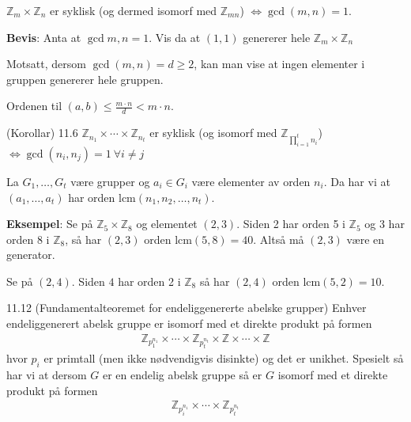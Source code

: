 \begin{theorem*}{11.5}{}
	$\mathbb{Z}_m\times \mathbb{Z}_n$ er syklisk (og dermed isomorf med $\mathbb{Z}_{mn}$)
	$\iff \gcd(m,n)=1$.
\end{theorem*}

\textbf{Bevis}: Anta at $\gcd{m,n}=1$. Vis da at $(1,1)$ genererer hele
$\mathbb{Z}_m\times \mathbb{Z}_n$

Motsatt, dersom $\gcd(m,n)=d\geq 2$, kan man vise at ingen elementer i gruppen genererer hele
gruppen.

Ordenen til $(a,b)\leq \frac{m\cdot n}{d}<m\cdot n$.

\begin{theorem*}{(Korollar) 11.6}{}
	$\mathbb{Z}_{n_1}\times\cdots\times \mathbb{Z}_{n_t}$ er syklisk (og isomorf med
	$\mathbb{Z}_{\prod_{i=1}^t n_i}$) $\iff \gcd(n_i, n_j)=1\ \forall i\neq j$
\end{theorem*}

\begin{theorem*}{11.9}{}
  La $G_1,\dots,G_t$ være grupper og $a_i\in G_i$ være elementer av orden $n_i$. Da har vi at
  $(a_1,\dots,a_t)$ har orden $\text{lcm}(n_1,n_2,\dots,n_t)$.
\end{theorem*}

\textbf{Eksempel}: Se på $\mathbb{Z}_5\times \mathbb{Z}_8$ og elementet $(2,3)$. Siden 
2 har orden 5 i $\mathbb{Z}_5$ og 3 har orden 8 i $\mathbb{Z}_8$, så har $(2,3)$
orden $\text{lcm}(5,8)=40$. Altså må $(2,3)$ være en generator.

Se på $(2,4)$. Siden $4$ har orden 2 i $\mathbb{Z}_8$ så har $(2,4)$ orden $\text{lcm}(5,2)=10$.


\begin{theorem*}{11.12 (Fundamentalteoremet for endeliggenererte abelske grupper)}{}
  Enhver endeliggenerert abelsk gruppe er isomorf med et direkte produkt på formen
  \begin{align}
    \mathbb{Z}_{p_1^{n_1}}\times\cdots\times \mathbb{Z}_{p_t^{n_t}}
    \times\mathbb{Z}\times\cdots\times \mathbb{Z}
  \end{align}
  hvor $p_i$ er primtall (men ikke nødvendigvis disinkte) og det er unikhet. Spesielt så har vi
  at dersom $G$ er en endelig abelsk gruppe så er $G$ isomorf med et direkte produkt på
  formen
  \begin{align}
    \mathbb{Z}_{p_i^{n_1}}\times\cdots\times \mathbb{Z}_{p_t^{n_t}}
  \end{align}
\end{theorem*}

